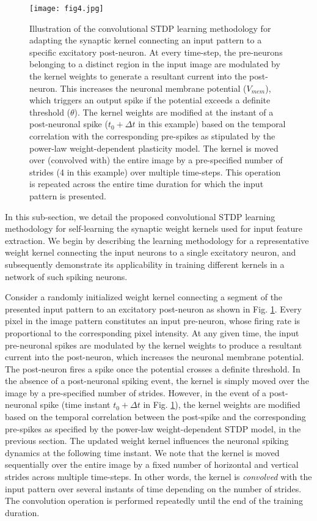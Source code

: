 \documentclass[journal, onecolumn]{IEEEtran}
\begin{document}
\begin{figure}[!t]
\centering
\texttt{[image: fig4.jpg]}
\caption{Illustration of the convolutional STDP learning methodology for adapting the synaptic kernel connecting an input pattern to a specific excitatory post-neuron. At every time-step, the pre-neurons belonging to a distinct region in the input image are modulated by the kernel weights to generate a resultant current into the post-neuron. This increases the neuronal membrane potential ($V_{mem}$), which triggers an output spike if the potential exceeds a definite threshold ($\theta$). The kernel weights are modified at the instant of a post-neuronal spike ($t_{0}+\Delta t$ in this example) based on the temporal correlation with the corresponding pre-spikes as stipulated by the power-law weight-dependent plasticity model. The kernel is moved over (convolved with) the entire image by a pre-specified number of strides (4 in this example) over multiple time-steps. This operation is repeated across the entire time duration for which the input pattern is presented.}
\label{fig:Conv_STDP}
\end{figure}

In this sub-section, we detail the proposed convolutional STDP learning methodology for self-learning the synaptic weight kernels used for input feature extraction. We begin by describing the learning methodology for a representative weight kernel connecting the input neurons to a single excitatory neuron, and subsequently demonstrate its applicability in training different kernels in a network of such spiking neurons.

Consider a randomly initialized weight kernel connecting a segment of the presented input pattern to an excitatory post-neuron as shown in Fig. \ref{fig:Conv_STDP}. Every pixel in the image pattern constitutes an input pre-neuron, whose firing rate is proportional to the corresponding pixel intensity. At any given time, the input pre-neuronal spikes are modulated by the kernel weights to produce a resultant current into the post-neuron, which increases the neuronal membrane potential. The post-neuron fires a spike once the potential crosses a definite threshold. In the absence of a post-neuronal spiking event, the kernel is simply moved over the image by a pre-specified number of strides. However, in the event of a post-neuronal spike (time instant $t_{0}+\Delta t$ in Fig. \ref{fig:Conv_STDP}), the kernel weights are modified based on the temporal correlation between the post-spike and the corresponding pre-spikes as specified by the power-law weight-dependent STDP model, in the previous section. The updated weight kernel influences the neuronal spiking dynamics at the following time instant. We note that the kernel is moved sequentially over the entire image by a fixed number of horizontal and vertical strides across multiple time-steps. In other words, the kernel is \textit{convolved} with the input pattern over several instants of time depending on the number of strides. The convolution operation is performed repeatedly until the end of the training duration.
\end{document}
